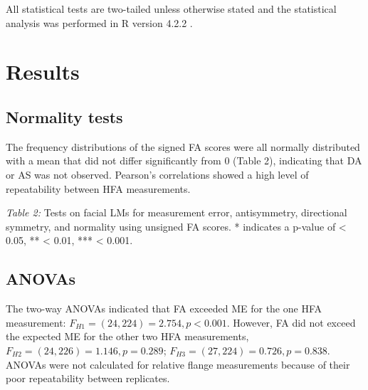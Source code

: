 All statistical tests are two-tailed unless otherwise stated and the statistical analysis was performed in R version 4.2.2 \citep{R.2018}. 

\section{Results}

\subsection{Normality tests}

The frequency distributions of the signed FA scores were all normally distributed with a mean that did not differ significantly from 0 (Table 2), indicating that DA or AS was not observed. Pearson's correlations showed a high level of repeatability between HFA measurements.
\begin{center}
\end{center}

\textit{Table 2:} Tests on facial LMs for measurement error, antisymmetry, directional symmetry, and normality using unsigned FA scores. * indicates a p-value of < 0.05, ** < 0.01, *** < 0.001.

\subsection{ANOVAs}

The two-way ANOVAs indicated that FA exceeded ME for the one HFA measurement: \(F_{H1} = (24,224) = 2.754, p < 0.001\). However, FA did not exceed the expected ME for the other two HFA measurements, \(F_{H2} = (24,226) = 1.146, p=0.289\); \(F_{H3} = (27,224) = 0.726, p=0.838\).
ANOVAs were not calculated for relative flange measurements because of their poor repeatability between replicates.

